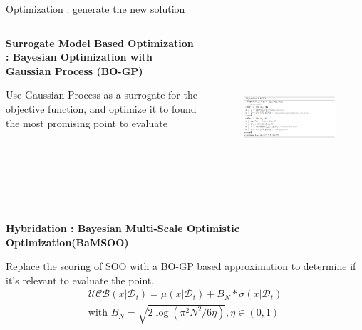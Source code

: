 \begin{frame}[allowframebreaks]{Optimization : generate the new solution}
    \framebreak

    \begin{columns}
        \begin{column}{0.3\textwidth}
            \textbf{Surrogate Model Based Optimization : Bayesian Optimization with Gaussian Process (BO-GP)}

            Use Gaussian Process as a surrogate for the objective function, and optimize it to found the most promising point to evaluate
            
        \end{column}        
        \begin{column}{0.7\textwidth}
            \begin{figure}[h]
                \centering
                \includegraphics[height = 6cm]{imgs/algo/bo.png}
            \end{figure}
        \end{column}
    \end{columns}

    \framebreak

    \begin{columns}
        \begin{column}{0.5\textwidth}
            \textbf{Hybridation : Bayesian Multi-Scale Optimistic Optimization(BaMSOO)}

            Replace the scoring of SOO with a BO-GP based approximation to determine if it's relevant to evaluate the point.
            \begin{equation}
                \begin{split}
                \mathcal{UCB}(x| \mathcal D_t) = \mu(x|\mathcal D_t) +  B_N * \sigma(x|\mathcal D_t) 
                \\ \text{with } B_N = \sqrt{2 \log (\pi^2 N^2/6 \eta)} , \eta \in (0,1)      
                \end{split}  
                \label{eq:ucb}
            \end{equation}
            

\end{column}
\end{columns}
\end{frame}
